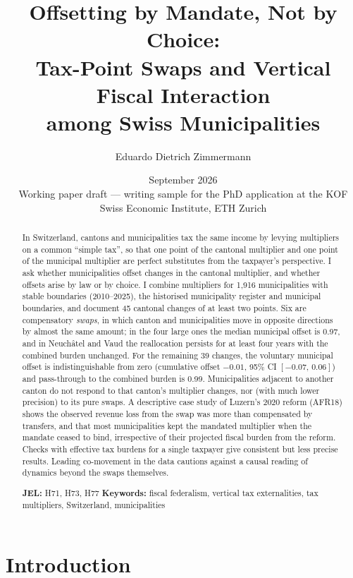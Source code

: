 \documentclass[11pt,a4paper]{article}
\title{\textbf{Offsetting by Mandate, Not by Choice:}\\[2pt] Tax-Point Swaps and Vertical Fiscal Interaction\\ among Swiss Municipalities}
\author{Eduardo Dietrich Zimmermann}
\date{September 2026\\[2pt] \small Working paper draft --- writing sample for the PhD application at the KOF Swiss Economic Institute, ETH Zurich}
\begin{document}
\maketitle

\begin{abstract}\noindent
In Switzerland, cantons and municipalities tax the same income by levying multipliers on a common ``simple tax'', so that one point of the cantonal multiplier and one point of the municipal multiplier are perfect substitutes from the taxpayer's perspective. I ask whether municipalities offset changes in the cantonal multiplier, and whether offsets arise by law or by choice. I combine multipliers for 1,916 municipalities with stable boundaries (2010--2025), the historised municipality register and municipal boundaries, and document 45 cantonal changes of at least two points. Six are compensatory \emph{swaps}, in which canton and municipalities move in opposite directions by almost the same amount; in the four large ones the median municipal offset is 0.97, and in Neuch\^atel and Vaud the reallocation persists for at least four years with the combined burden unchanged. For the remaining 39 changes, the voluntary municipal offset is indistinguishable from zero (cumulative offset $-0.01$, 95\% CI $[-0.07,\,0.06]$) and pass-through to the combined burden is 0.99. Municipalities adjacent to another canton do not respond to that canton's multiplier changes, nor (with much lower precision) to its pure swaps. A descriptive case study of Luzern's 2020 reform (AFR18) shows the observed revenue loss from the swap was more than compensated by transfers, and that most municipalities kept the mandated multiplier when the mandate ceased to bind, irrespective of their projected fiscal burden from the reform. Checks with effective tax burdens for a single taxpayer give consistent but less precise results. Leading co-movement in the data cautions against a causal reading of dynamics beyond the swaps themselves.
\medskip

\noindent\textbf{JEL:} H71, H73, H77 \quad \textbf{Keywords:} fiscal federalism, vertical tax externalities, tax multipliers, Switzerland, municipalities
\end{abstract}

\section{Introduction}
\end{document}
